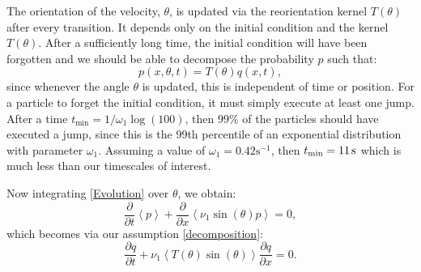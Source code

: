 \documentclass[twocolumn]{biophys}
\newlength\tindent
\renewcommand{\indent}{\hspace*{\tindent}}
\def\mean#1{\left< #1 \right>}
\begin{document}
\indent The orientation of the velocity, $\theta$, is updated via the reorientation kernel $T(\theta)$ after every transition.
It depends only on the initial condition and the kernel $T(\theta)$.
After a sufficiently long time, the initial condition will have been forgotten and we should be able to decompose the probability $p$ such that:
\begin{equation}\label{decomposition}
 p(x,\theta , t) = T(\theta) q(x,t),
\end{equation}
since whenever the angle $\theta$ is updated, this is independent of time or position. 
For a particle to forget the initial condition, it must simply execute at least one jump. 
After a time $t_{\text{min}} = 1/\omega_1 \log (100)$, then $99\%$ of the particles should have executed a jump, since this is the 99th percentile of an exponential distribution with parameter $\omega_1$.
Assuming a value of $\omega_1 = 0.42 \text{s}^{-1}$, then $t_{\text{min}} = 11 \hspace{0.5mm} \text{s}$ which is much less than our timescales of interest. 

\indent Now integrating \eqref{Evolution} over $\theta$, we obtain:
\begin{equation}
 \frac{\partial}{\partial t} \mean{p} + \frac{\partial}{\partial x} \mean{\nu_1 \sin(\theta) p} = 0,
\end{equation}
which becomes via our assumption \eqref{decomposition}: 
\begin{equation}
 \frac{\partial q}{\partial t} + \nu_1 \mean{T(\theta) \sin(\theta)} \frac{\partial q}{\partial x} = 0.
\end{equation}
\end{document}
